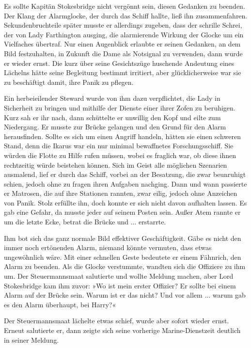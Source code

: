 \bigpar

Es sollte Kapitän Stokesbridge nicht vergönnt sein, diesen Gedanken
zu beenden. Der Klang der Alarmglocke, der durch das Schiff hallte,
ließ ihn zusammenfahren. Sekundenbruchteile später musste er
allerdings zugeben, dass der schrille Schrei, der von Lady
Farthington ausging, die alarmierende Wirkung der Glocke um ein
Vielfaches übertraf. Nur einen Augenblick erlaubte er seinen
Gedanken, an dem Bild festzuhalten, in Zukunft die Dame als
Notsignal zu verwenden, dann wurde er wieder ernst. Die kurz über
seine Gesichtszüge huschende Andeutung eines Lächelns hätte seine
Begleitung bestimmt irritiert, aber glücklicherweise war sie zu
beschäftigt damit, ihre Panik zu pflegen.

Ein herbeieilender Steward wurde von ihm dazu verpflichtet, die
Lady in Sicherheit zu bringen und mithilfe der Dienste einer ihrer
Zofen zu beruhigen. Kurz sah er ihr nach, dann schüttelte er
unwillig den Kopf und eilte zum Niedergang. Er musste zur Brücke
gelangen und den Grund für den Alarm herausfinden. Sollte es sich
um einen Angriff handeln, hätten sie einen schweren Stand, denn die
Ikarus war ein nur minimal bewaffnetes Forschungsschiff. Sie würden
die Flotte zu Hilfe rufen müssen, wobei es fraglich war, ob diese
ihnen rechtzeitig würde beistehen können. Sich im Geist alle
möglichen Szenarien ausmalend, lief er durch das Schiff, vorbei an
der Besatzung, die zwar beunruhigt schien, jedoch ohne zu fragen
ihren Aufgaben nachging. Dann und wann passierte er Matrosen, die
auf ihre Stationen rannten, zwar eilig, jedoch ohne Anzeichen von
Panik. Stolz erfüllte ihn, doch konnte er sich nicht davon
aufhalten lassen. Es gab eine Gefahr, da musste jeder auf seinem
Posten sein. Außer Atem rannte er um die letzte Ecke, betrat die
Brücke und ... erstarrte.

Ihm bot sich das ganz normale Bild effektiver Geschäftigkeit. Gäbe
es nicht den immer noch ertönenden Alarm, niemand könnte vermuten,
dass etwas ungewöhnlich wäre. Mit einer schnellen Geste bedeutete
er einem Fähnrich, den Alarm zu beenden. Als die Glocke verstummte,
wandten sich die Offiziere zu ihm um. Der Steuermannsmaat
salutierte und wollte Meldung machen, aber Lord Stokesbridge kam
ihm zuvor: »Wo ist mein erster Offizier? Er sollte bei einem Alarm
auf der Brücke sein. Warum ist er das nicht? Und vor allem ...
warum gab es den Alarm überhaupt, bei Harry?«

Der Steuermannsmaat lächelte etwas schief, wurde aber sofort wieder
ernst. Erneut salutierte er, dann zeigte sich seine vorherige
Marine-Dienstzeit deutlich in seiner Meldung.

